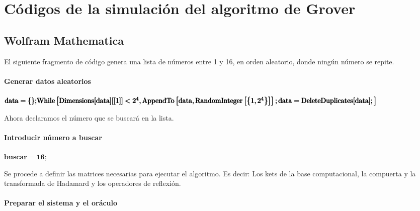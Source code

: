 \chapter{Códigos de la simulación del algoritmo de Grover}

\section{Wolfram Mathematica}

El siguiente fragmento de código genera una lista de números entre 1 y 16, en orden aleatorio, donde ningún número se repite.

\subsubsection*{Generar datos aleatorios}

\begin{doublespace}
\noindent\(\pmb{\text{data}=\{\};}\\
\pmb{\text{While}\left[\text{Dimensions}[\text{data}][[1]]<2^4,\text{AppendTo}\left[\text{data},\text{RandomInteger}\left[\left\{1,2^4\right\}\right]\right];\text{data}=\text{DeleteDuplicates}[\text{data}];\right]}\)
\end{doublespace}

Ahora declaramos el número que se buscará en la lista.

\subsubsection*{Introducir n{\' u}mero a buscar}

\begin{doublespace}
\noindent\(\pmb{\text{buscar}=16;}\)
\end{doublespace}

Se procede a definir las matrices necesarias para ejecutar el algoritmo. Es decir: Los kets de la base computacional, la compuerta y la transformada de Hadamard y los operadores de reflexión.

\subsubsection*{Preparar el sistema y el or{\' a}culo}

